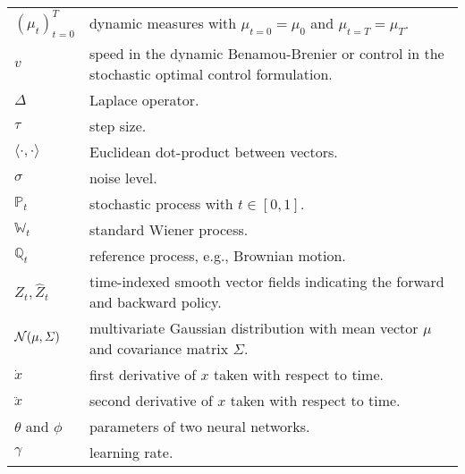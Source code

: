 \begin{tabularx}{\textwidth}{lX}
 	$(\mu_t)_{t=0}^T$ & dynamic measures with $\mu_{t=0} = \mu_0$ and $\mu_{t=T} = \mu_T$. \\
 	$v$ & speed in the dynamic Benamou-Brenier or control in the stochastic optimal control formulation. \\
 	$\Delta$ & Laplace operator. \\
 	$\tau$ & step size. \\
 	$\langle\cdot, \cdot\rangle$ & Euclidean dot-product between vectors. \\
 	$\sigma$ & noise level. \\
 	$\mathbb{P}_t$ & stochastic process with $t \in [0,1]$. \\
 	$\mathbb{W}_t$ & standard Wiener process. \\
 	$\mathbb{Q}_t$ & reference process, e.g., Brownian motion. \\
 	$Z_t, \hat{Z}_t$ & time-indexed smooth vector fields indicating the forward and backward policy. \\
 	${\mathcal{N}}(\mu, \Sigma)$ & multivariate Gaussian distribution with mean vector $\mu$ and covariance matrix $\Sigma$. \\
 	$\dot{x}$ & first derivative of $x$ taken with respect to time. \\
 	$\ddot{x}$ & second derivative of $x$ taken with respect to time. \\
 	$\theta$ and $\phi$ & parameters of two neural networks. \\
 	$\gamma$ & learning rate. \\
 	
 	
\end{tabularx}






